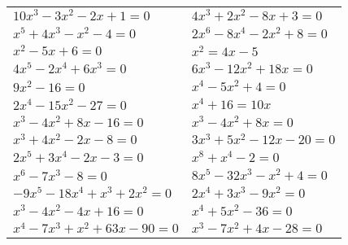\documentclass[12pt,a4paper]{article}
\begin{document}
\begin{enumerate}[1.]
\begin{enumerate}[1)]
\begin{tabular}{p{7cm} p{7cm}}
				\item $10x^3-3x^2-2x+1=0$		& \item $4x^3+2x^2-8x+3=0$ \\
				\item $x^5+4x^3-x^2-4=0$		& \item $2x^6-8x^4-2x^2+8=0$ \\
				\item $x^2-5x+6=0$ 				& \item $x^2=4x-5$\\
				\item $4x^5-2x^4+6x^3=0$ 		& \item $6x^3-12x^2+18x=0$\\
				\item $9x^2-16=0$				& \item $x^4-5x^2+4=0$\\
				\item $2x^4-15x^2-27=0 $ 		& \item $x^4+16=10x$\\
				\item $x^3-4x^2+8x-16=0 $ 		& \item $x^3-4x^2+8x=0$\\
				\item $x^3+4x^2-2x-8=0 $ 		& \item $3x^3+5x^2-12x-20=0$\\
				\item $2x^5+3x^4-2x-3=0 $ 		& \item $x^8+x^4-2=0$\\
				\item $x^6-7x^3-8=0 $ 			& \item $8x^5-32x^3-x^2+4=0$\\
				\item $-9x^5-18x^4+x^3+2x^2=0 $ & \item $2x^4+3x^3-9x^2=0$\\
				\item $x^3-4x^2-4x+16=0$ 		& \item $x^4+5x^2-36=0$\\
				\item $x^4-7x^3+x^2+63x-90=0$ 	& \item $x^3 - 7x^2 + 4x - 28 = 0$\\
				\end{tabular} \end{enumerate}
	\end{enumerate}
\end{document}

